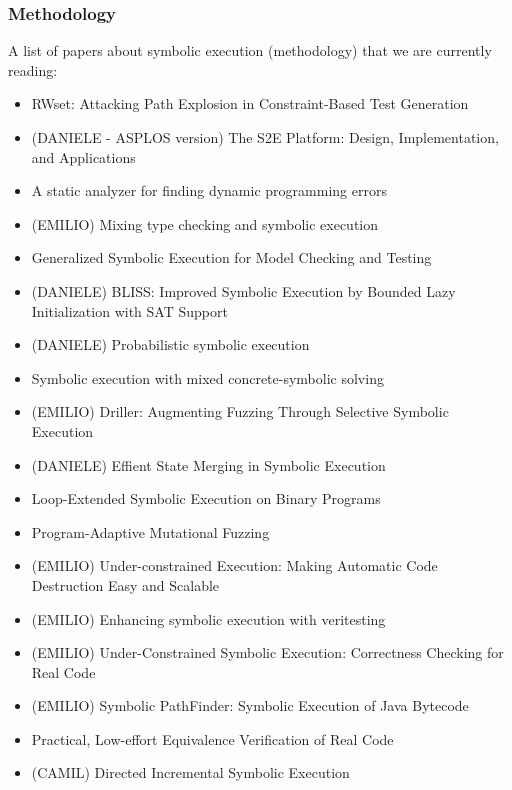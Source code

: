 \documentclass[10pt, a4paper]{article}
\begin{document}
\subsubsection{Methodology}
A list of papers about symbolic execution (methodology) that we are currently reading:
\begin{itemize}
  \item \cite{BCE-TACAS08} RWset: Attacking Path Explosion in Constraint-Based Test Generation
  \item (DANIELE - ASPLOS version) \cite{CKC-TOCS12} The S2E Platform: Design, Implementation, and Applications
  \item \cite{BPS-SPE00} A static analyzer for finding dynamic programming errors
  \item (EMILIO) \cite{KCF-PLDI10} Mixing type checking and symbolic execution
  \item \cite{KPV-TACAS03} Generalized Symbolic Execution for Model Checking and Testing
  \item (DANIELE) \cite{BLISS-TSE15} BLISS: Improved Symbolic Execution by Bounded Lazy Initialization with SAT Support
  \item (DANIELE) \cite{GDV-ISSTA12} Probabilistic symbolic execution
  \item \cite{PRV-ISSTA11} Symbolic execution with mixed concrete-symbolic solving
  \item (EMILIO) \cite{DRILLER-NDSS16} Driller: Augmenting Fuzzing Through Selective Symbolic Execution 
  \item (DANIELE) \cite{KKB-PLDI12} Effient State Merging in Symbolic Execution
  \item \cite{SPM-ISSTA09} Loop-Extended Symbolic Execution on Binary Programs
  \item \cite{CWD-SSP15} Program-Adaptive Mutational Fuzzing
  \item (EMILIO) \cite{ED-ISSTA07} Under-constrained Execution: Making Automatic Code Destruction Easy and Scalable
  \item (EMILIO) \cite{VERITESTING-ICSE14} Enhancing symbolic execution with veritesting
  \item (EMILIO) \cite{UCKLEE-USEC15} Under-Constrained Symbolic Execution: Correctness Checking for Real Code
  \item (EMILIO) \cite{PATHFINDER-ASE10} Symbolic PathFinder: Symbolic Execution of Java Bytecode
  \item \cite{RE-CAV11} Practical, Low-effort Equivalence Verification of Real Code
  \item (CAMIL)\cite{PYR-PLDI11} Directed Incremental Symbolic Execution

\end{itemize}
\end{document}

